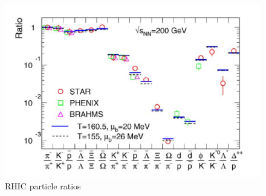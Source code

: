 \begin{figure}[ht]
  \centering
  \includegraphics[width=.75\textwidth]{figures/rhic-particle-ratios.png}
  \caption{RHIC particle ratios \protect\cite{ANDRONIC2006167}}
  \label{fig:rhic-particle-ratios}
\end{figure}
